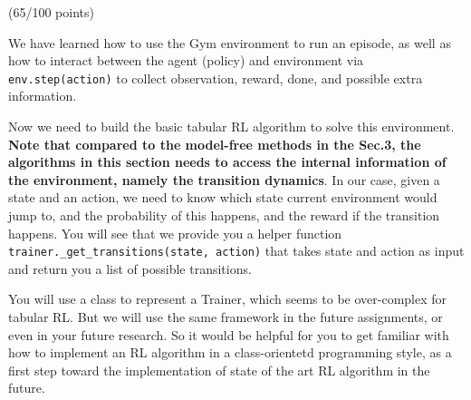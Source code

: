 \documentclass[11pt]{article}
\begin{document}
(65/100 points)

We have learned how to use the Gym environment to run an episode, as
well as how to interact between the agent (policy) and environment via
\texttt{env.step(action)} to collect observation, reward, done, and
possible extra information.

Now we need to build the basic tabular RL algorithm to solve this
environment. \textbf{Note that compared to the model-free methods in the
Sec.3, the algorithms in this section needs to access the internal
information of the environment, namely the transition dynamics}. In our
case, given a state and an action, we need to know which state current
environment would jump to, and the probability of this happens, and the
reward if the transition happens. You will see that we provide you a
helper function \texttt{trainer.\_get\_transitions(state,\ action)} that
takes state and action as input and return you a list of possible
transitions.

You will use a class to represent a Trainer, which seems to be
over-complex for tabular RL. But we will use the same framework in the
future assignments, or even in your future research. So it would be
helpful for you to get familiar with how to implement an RL algorithm in
a class-orientetd programming style, as a first step toward the
implementation of state of the art RL algorithm in the future.
\end{document}
